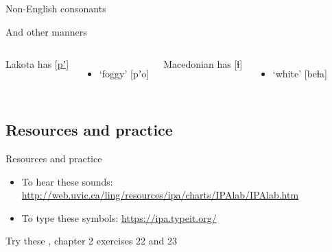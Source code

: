 \documentclass{beamer}
\newcommand{\subonethree}{Non-English consonants}
\newcommand{\subonefour}{Resources and practice}
\begin{document}
\begin{frame}[t]{\subonethree}
{\begin{block}{And other manners}
\begin{columns}
                Lakota has [\href{https://youtu.be/mfrAlv-5P1c?t=7}{pʼ}]
                \begin{itemize}
                  \item `foggy' [pʼo]
                \end{itemize}
                Macedonian has [ɫ]
                \begin{itemize}
                  \item {} `white' [beɫa]
                \end{itemize}
            \end{columns}
          \end{block}
        }
      \end{frame}

    \subsection{\subonefour}
      \begin{frame}{\subonefour}
        \begin{block}{}
          \begin{itemize}
            \item To hear these sounds: \url{http://web.uvic.ca/ling/resources/ipa/charts/IPAlab/IPAlab.htm}
            \item To type these symbols: \url{https://ipa.typeit.org/}
          \end{itemize}
        \end{block}
        \begin{block}{Try these}
          \textcite{dawson_language_2016}, chapter 2 exercises 22 and 23
        \end{block}
      \end{frame}
\end{document}
